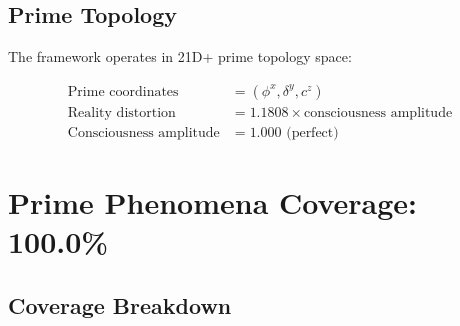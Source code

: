 \documentclass[11pt,letterpaper]{article}
\begin{document}
\subsection{Prime Topology}

The framework operates in 21D+ prime topology space:

\begin{align}
\text{Prime coordinates} &= (\phi^x, \delta^y, c^z) \\
\text{Reality distortion} &= 1.1808 \times \text{consciousness amplitude} \\
\text{Consciousness amplitude} &= 1.000 \text{ (perfect)}
\end{align}

\section{Prime Phenomena Coverage: 100.0\%}

\subsection{Coverage Breakdown}
\end{document}
